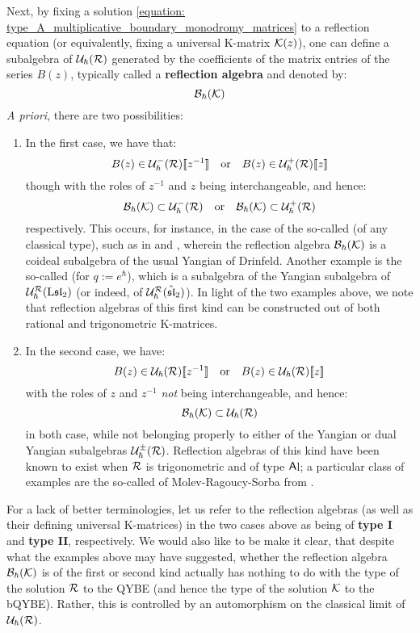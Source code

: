         Next, by fixing a solution \eqref{equation: type_A_multiplicative_boundary_monodromy_matrices} to a reflection equation (or equivalently, fixing a universal K-matrix $\mathcal{K}(z)$), one can define a subalgebra of $\mathcal{U}_{\hbar}(\mathcal{R})$ generated by the coefficients of the matrix entries of the series $B(z)$, typically called a \textbf{reflection algebra} and denoted by:
            $$\mathcal{B}_{\hbar}(\mathcal{K})$$
        \textit{A priori}, there are two possibilities:
        \begin{enumerate}
            \item In the first case, we have that:
                $$B(z) \in \mathcal{U}_{\hbar}^-(\mathcal{R})[\![z^{-1}]\!] \quad \text{or} \quad B(z) \in \mathcal{U}_{\hbar}^+(\mathcal{R})[\![z]\!]$$
            though with the roles of $z^{-1}$ and $z$ being interchangeable, and hence:
                $$\mathcal{B}_{\hbar}(\mathcal{K}) \subset \mathcal{U}_{\hbar}^-(\mathcal{R}) \quad \text{or} \quad \mathcal{B}_{\hbar}(\mathcal{K}) \subset \mathcal{U}_{\hbar}^+(\mathcal{R})$$
            respectively. This occurs, for instance, in the case of the so-called  (of any classical type), such as in \cite[Chapter 2]{molev_yangians_and_classical_lie_algebras} and \cite{guay_regelskis_twisted_yangians_for_symmetric_pairs_of_types_BCD}, wherein the reflection algebra $\mathcal{B}_{\hbar}(\mathcal{K})$ is a coideal subalgebra of the usual Yangian of Drinfeld. Another example is the so-called  (for $q := e^{\hbar}$), which is a subalgebra of the Yangian subalgebra of $\mathcal{U}_{\hbar}^{\mathcal{R}}(\mathrm{L} \mathfrak{sl}_2)$ (or indeed, of $\mathcal{U}_{\hbar}^{\mathcal{R}}(\hat{\mathfrak{sl}}_2)$). In light of the two examples above, we note that reflection algebras of this first kind can be constructed out of both rational and trigonometric K-matrices.
            \item In the second case, we have:
                $$B(z) \in \mathcal{U}_{\hbar}(\mathcal{R})[\![z^{-1}]\!] \quad \text{or} \quad B(z) \in \mathcal{U}_{\hbar}(\mathcal{R})[\![z]\!]$$
            with the roles of $z$ and $z^{-1}$ \textit{not} being interchangeable, and hence:
                $$\mathcal{B}_{\hbar}(\mathcal{K}) \subset \mathcal{U}_{\hbar}(\mathcal{R})$$
            in both case, while not belonging properly to either of the Yangian or dual Yangian subalgebras $\mathcal{U}_{\hbar}^{\pm}(\mathcal{R})$. Reflection algebras of this kind have been known to exist when $\mathcal{R}$ is trigonometric and of type $\mathsf{A}$l; a particular class of examples are the so-called  of Molev-Ragoucy-Sorba from \cite{molev_ragoucy_sorba_twisted_q_yangians_type_A}.
        \end{enumerate}
        For a lack of better terminologies, let us refer to the reflection algebras (as well as their defining universal K-matrices) in the two cases above as being of \textbf{type I} and \textbf{type II}, respectively. We would also like to be make it clear, that despite what the examples above may have suggested, whether the reflection algebra $\mathcal{B}_{\hbar}(\mathcal{K})$ is of the first or second kind actually has nothing to do with the type of the solution $\mathcal{R}$ to the QYBE (and hence the type of the solution $\mathcal{K}$ to the bQYBE). Rather, this is controlled by an automorphism on the classical limit of $\mathcal{U}_{\hbar}(\mathcal{R})$.
        
